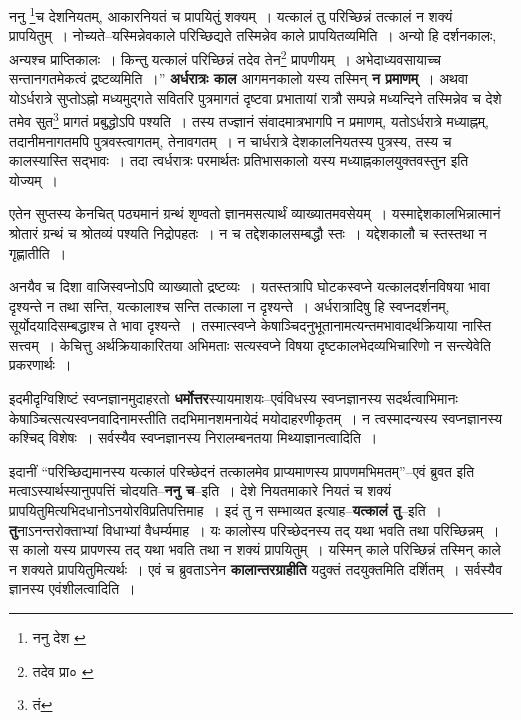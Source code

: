 \documentclass[article,12pt,a4paper]{memoir}
\begin{document}
	ननु \footnote{ननु देश \cite{dp-msA} \cite{dp-edP} \cite{dp-edE}}\-च देशनियतम्, आकारनियतं च प्रापयितुं शक्यम् । यत्कालं तु परिच्छिन्नं तत्कालं न शक्यं प्रापयितुम् । नोच्यते--यस्मिन्नेवकाले परिच्छिद्यते तस्मिन्नेव काले प्रापयितव्यमिति । अन्यो हि दर्शनकालः, अन्यश्च प्राप्तिकालः । किन्तु यत्कालं परिच्छिन्नं तदेव तेन\footnote{तदेव प्रा० \cite{dp-msD} \cite{dp-msA} \cite{dp-edP} \cite{dp-edE}} प्रापणीयम् । अभेदाध्यवसायाच्च सन्तानगतमेकत्वं द्रष्टव्यमिति ।” \textbf{अर्धरात्रः काल} आगमनकालो यस्य तस्मिन् \textbf{न प्रमाणम्} । अथवा योऽर्धरात्रे सुप्तोऽह्नो मध्यमुद्गते सवितरि पुत्रमागतं दृष्टवा प्रभातायां रात्रौ सम्पन्ने मध्यन्दिने तस्मिन्नेव च देशे तमेव सुत\footnote{तं} प्रागतं प्रबुद्धोऽपि पश्यति । तस्य तज्ज्ञानं संवादमात्रभागपि न प्रमाणम्, यतोऽर्धरात्रे मध्याह्नम्, तदानीमनागतमपि पुत्रवस्त्वागतम्, तेनावगतम् । न चार्धरात्रे देशकालनियतस्य पुत्रस्य, तस्य च कालस्यास्ति सद्भावः । तदा त्वर्धरात्रः परमार्थतः प्रतिभासकालो यस्य मध्याह्नकालयुक्तवस्तुन इति योज्यम् ।
	\pend
      

	  \pstart एतेन सुप्तस्य केनचित् पठ्यमानं ग्रन्थं शृण्वतो ज्ञानमसत्यार्थं व्याख्यातमवसेयम् । यस्माद्देशकालभिन्नात्मानं श्रोतारं ग्रन्थं च श्रोतव्यं पश्यति निद्रोपहतः । न च तद्देशकालसम्बद्धौ स्तः । यद्देशकालौ च स्तस्तथा न गृह्णातीति ।
	\pend
      

	  \pstart अनयैव च दिशा वाजिस्वप्नोऽपि व्याख्यातो द्रष्टव्यः । यतस्तत्रापि घोटकस्वप्ने यत्कालदर्शनवि\leavevmode{}षया भावा दृश्यन्ते न तथा सन्ति, यत्कालाश्च सन्ति तत्काला न दृश्यन्ते । अर्धरात्रादिषु हि स्वप्नदर्शनम्, सूर्योदयादिसम्बद्धाश्च ते भावा दृश्यन्ते । तस्मात्स्वप्ने केषाञ्चिदनुभूतानामत्यन्तमभावादर्थक्रियाया नास्ति सत्त्वम् । केचित्तु अर्थक्रियाकारितया अभिमताः सत्यस्वप्ने विषया दृष्टकालभेदव्यभिचारिणो न सन्त्येवेति प्रकरणार्थः ।
	\pend
      

	  \pstart इदमीदृग्विशिष्टं स्वप्नज्ञानमुदाहरतो \textbf{धर्मोत्तर}स्यायमाशयः--एवंविधस्य स्वप्नज्ञानस्य सदर्थत्वाभिमानः केषाञ्चित्सत्यस्वप्नवादिनामस्तीति तदभिमानशमनायेदं मयोदाहरणीकृतम् । न त्वस्मादन्यस्य स्वप्नज्ञानस्य कश्चिद् विशेषः । सर्वस्यैव स्वप्नज्ञानस्य निरालम्बनतया मिथ्याज्ञानत्वादिति ।
	\pend
      

	  \pstart इदानीं “परिच्छिद्यमानस्य यत्कालं परिच्छेदनं तत्कालमेव प्राप्यमाणस्य प्रापणमभिमतम्”--एवं ब्रुवत इति मत्वाऽस्यार्थस्यानुपपत्तिं चोदयति--\textbf{ननु च}--इति । देशे नियतमाकारे नियतं च शक्यं प्रापयितुमित्यभिदधानोऽनयोरविप्रतिपत्तिमाह । इदं तु न सम्भाव्यत इत्याह--\textbf{यत्कालं तु}--इति । \textbf{तु}नाऽनन्तरोक्ताभ्यां विधाभ्यां वैधर्म्यमाह । यः कालोस्य परिच्छेदनस्य तद् यथा भवति तथा परिच्छिन्नम् । स कालो यस्य प्रापणस्य तद् यथा भवति तथा न शक्यं प्रापयितुम् । यस्मिन् काले परिच्छिन्नं तस्मिन् काले न शक्यते प्रापयितुमित्यर्थः । एवं च ब्रुवताऽनेन \textbf{कालान्तरग्राहीति} यदुक्तं तदयुक्तमिति दर्शितम् । सर्वस्यैव ज्ञानस्य एवंशीलत्वादिति ।
	\pend
      
\end{document}
